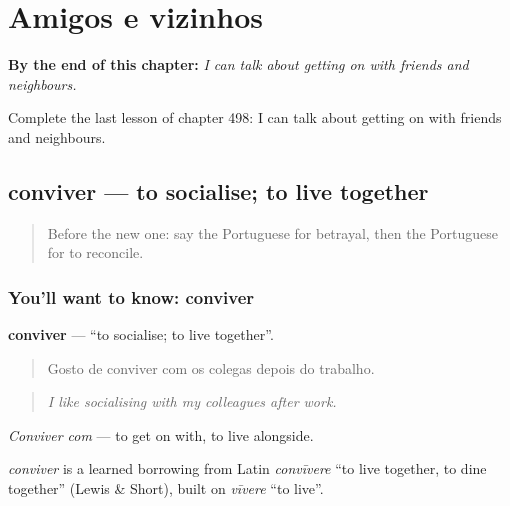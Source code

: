 
\chapter{Amigos e vizinhos}
\label{ch:pt-amigos-e-vizinhos}

\begin{chapteropening}
\textbf{By the end of this chapter:} \emph{I can talk about getting on with friends and neighbours.}

Complete the last lesson of chapter 498: I can talk about getting on with friends and neighbours.
\end{chapteropening}

\section[conviver]{conviver — to socialise; to live together}

\label{lesson:PT-C498-conviver}



\begin{quote}
Before the new one: say the Portuguese for betrayal, then the Portuguese for to reconcile.
\end{quote}

\subsection*{You'll want to know: conviver}
\textbf{conviver} — \textquotedblleft{}to socialise; to live together\textquotedblright{}.

\begin{quote}
Gosto de conviver com os colegas depois do trabalho.
\end{quote}

\begin{quote}
\emph{I like socialising with my colleagues after work.}
\end{quote}

\emph{Conviver com} — to get on with, to live alongside.

\begin{cousinweb}
\emph{conviver} is a learned borrowing from Latin \emph{convīvere} \textquotedblleft{}to live together, to dine together\textquotedblright{} (Lewis \& Short), built on \emph{vīvere} \textquotedblleft{}to live\textquotedblright{}.
\end{cousinweb}

